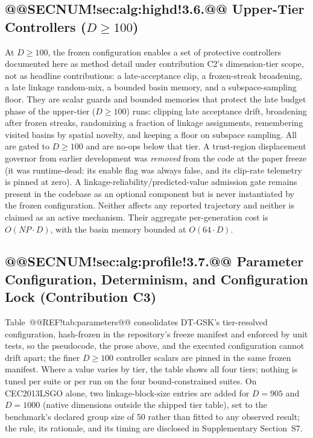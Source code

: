 \documentclass[10pt,a4paper]{article}
\newcommand{\dtgsk}{DT-GSK}
\begin{document}
\subsection{@@SECNUM!sec:alg:highd!3.6.@@ Upper-Tier Controllers ($D\ge100$)}\label{sec:alg:highd}


At $D\ge100$, the frozen configuration enables a set of protective
controllers documented here as method detail under contribution C2's
dimension-tier scope, not as headline contributions: a late-acceptance
clip, a frozen-streak broadening, a late linkage random-mix, a bounded
basin memory, and a subspace-sampling floor. 
They are scalar guards and bounded memories that protect the late
budget phase of the upper-tier ($D{\ge}100$) runs: clipping late acceptance
drift, broadening after frozen streaks, randomizing a fraction of
linkage assignments, remembering visited basins by spatial novelty, and
keeping a floor on subspace sampling. All are gated to
$D\ge100$ and are no-ops below that tier.
A trust-region displacement governor from earlier development was
\emph{removed} from the code at the paper freeze (it was runtime-dead: its
enable flag was always false, and its clip-rate telemetry is pinned at zero).
A linkage-reliability/predicted-value admission gate remains present in the
codebase as an optional component but is never instantiated by the frozen
configuration. Neither affects any reported trajectory and neither is claimed
as an active mechanism.
Their aggregate per-generation cost is $O(NP\cdot D)$, with the basin
memory bounded at $O(64\cdot D)$. 


\subsection{@@SECNUM!sec:alg:profile!3.7.@@ Parameter Configuration, Determinism, and Configuration Lock (Contribution C3)}\label{sec:alg:profile}


Table~@@REF!tab:parameters@@ consolidates \dtgsk{}'s tier-resolved
configuration, hash-frozen in the repository's freeze manifest and
enforced by unit tests, so the pseudocode, the prose above, and the
executed configuration cannot drift apart; the finer $D\ge100$
controller scalars are pinned in the same frozen manifest.
Where a value varies by tier, the table shows all four tiers; nothing
is tuned per suite or per run on the four bound-constrained suites. On
CEC2013LSGO alone, two linkage-block-size entries are added for
$D = 905$ and $D = 1000$ (native dimensions outside the shipped tier
table), set to the benchmark's declared group size of 50 rather than
fitted to any observed result; the rule, its rationale, and its timing
are disclosed in Supplementary Section~S7.
\end{document}
